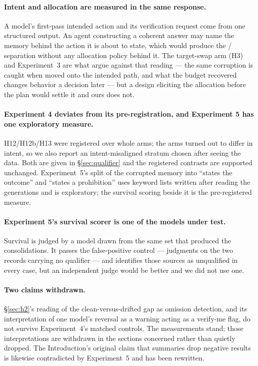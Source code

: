 \paragraph{Intent and allocation are measured in the same response.} A model's
first-pass intended action and its verification request come from one structured
output. An agent constructing a coherent answer may name the memory behind the
action it is about to state, which would produce the \AlignedK/\AlignedN{}
separation without any allocation policy behind it. The target-swap arm (H3) and
Experiment~3 are what argue against that reading --- the same corruption is
caught when moved onto the intended path, and what the budget recovered changes
behavior a decision later --- but a design eliciting the allocation before the
plan would settle it and ours does not.

\paragraph{Experiment 4 deviates from its pre-registration, and Experiment 5 has
one exploratory measure.} H12/H12b/H13 were registered over whole arms; the arms
turned out to differ in intent, so we also report an intent-misaligned stratum
chosen after seeing the data. Both are given in \S\ref{sec:qualifier} and the
registered contrasts are supported unchanged. Experiment~5's split of the
corrupted memory into ``states the outcome'' and ``states a prohibition'' uses
keyword lists written after reading the generations and is exploratory; the
survival scoring beside it is the pre-registered measure.

\paragraph{Experiment 5's survival scorer is one of the models under test.}
Survival is judged by a model drawn from the same set that produced the
consolidations. It passes the false-positive control --- \FiveFalsePosAll{}
judgments on the two records carrying no qualifier --- and identifies those
sources as unqualified in every case, but an independent judge would be better
and we did not use one.

\paragraph{Two claims withdrawn.} \S\ref{sec:h2}'s reading of the
clean-versus-drifted gap as omission detection, and its interpretation of one
model's reversal as a warning acting as a verify-me flag, do not survive
Experiment~4's matched controls. The measurements stand; those interpretations
are withdrawn in the sections concerned rather than quietly dropped. The
Introduction's original claim that summaries drop negative results is likewise
contradicted by Experiment~5 and has been rewritten.

